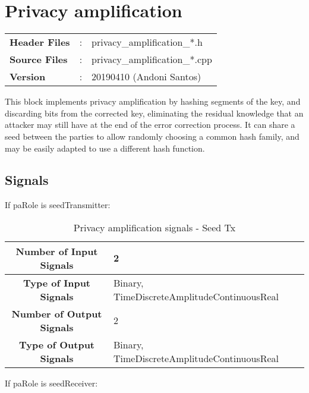 \clearpage
\graphicspath{{./lib/privacy_amplification/figures/}}
\section{Privacy amplification}

\begin{tcolorbox}	
	\begin{tabular}{p{2.75cm} p{0.2cm} p{10.5cm}} 	
        \textbf{Header Files}    &:& privacy\_amplification\_*.h \\
		\textbf{Source Files}    &:& privacy\_amplification\_*.cpp \\
        \textbf{Version}         &:& 20190410 (Andoni Santos)
	\end{tabular}
\end{tcolorbox}

\maketitle
This block implements privacy amplification by hashing segments of the key, and
discarding bits from the corrected key, eliminating the residual knowledge that
an attacker may still have at the end of the error correction process. It
can share a seed between the parties to allow randomly choosing a common hash
family, and may be easily adapted to use a different hash function.


\subsection*{Signals}

If paRole is seedTransmitter:

\begin{table}[h]
	\begin{tabular}{|c|l|}
		\hline
		\textbf{Number of Input Signals} & 2 \\ \hline
        \textbf{Type of Input Signals} & Binary, TimeDiscreteAmplitudeContinuousReal \\ \hline
    	\textbf{Number of Output Signals} & 2 \ \\ \hline
        \textbf{Type of Output Signals} & Binary, TimeDiscreteAmplitudeContinuousReal \\ \hline
	\end{tabular}
	\caption{Privacy amplification signals - Seed Tx}
	\label{table:privacy_amp_tx_signals}
\end{table}

If paRole is seedReceiver:

